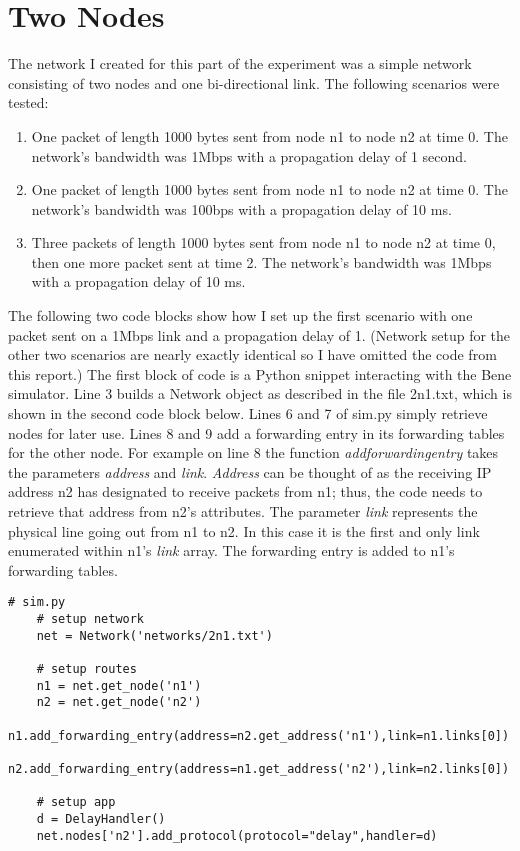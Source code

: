 \documentclass[11pt]{article}
\begin{document}
\section{Two Nodes}

The network I created for this part of the experiment was a simple network consisting of two nodes and one bi-directional link. The following scenarios were tested:

\begin{enumerate}

\item One packet of length 1000 bytes sent from node n1 to node n2 at time 0. The network's bandwidth was 1Mbps with a propagation delay of 1 second.

\item One packet of length 1000 bytes sent from node n1 to node n2 at time 0. The network's bandwidth was 100bps with a propagation delay of 10 ms.

\item Three packets of length 1000 bytes sent from node n1 to node n2 at time 0, then one more packet sent at time 2. The network's bandwidth was 1Mbps with a propagation delay of 10 ms.

\end{enumerate}

The following two code blocks show how I set up the first scenario with one packet sent on a 1Mbps link and a propagation delay of 1. (Network setup for the other two scenarios are nearly exactly identical so I have omitted the code from this report.) The first block of code is a Python snippet interacting with the Bene simulator. Line 3 builds a Network object as described in the file 2n1.txt, which is shown in the second code block below. Lines 6 and 7 of sim.py simply retrieve nodes for later use. Lines 8 and 9 add a forwarding entry in its forwarding tables for the other node. For example on line 8 the function \emph{add\textunderscore forwarding\textunderscore entry} takes the parameters \emph{address} and \emph{link}. \emph{Address} can be thought of as the receiving IP address n2 has designated to receive packets from n1; thus, the code needs to retrieve that address from n2's attributes. The parameter \emph{link} represents the physical line going out from n1 to n2. In this case it is the first and only link enumerated within n1's \emph{link} array. The forwarding entry is added to n1's forwarding tables.

\begin{lstlisting}
# sim.py
    # setup network
    net = Network('networks/2n1.txt')

    # setup routes
    n1 = net.get_node('n1')
    n2 = net.get_node('n2')
    n1.add_forwarding_entry(address=n2.get_address('n1'),link=n1.links[0])
    n2.add_forwarding_entry(address=n1.get_address('n2'),link=n2.links[0])

    # setup app
    d = DelayHandler()
    net.nodes['n2'].add_protocol(protocol="delay",handler=d)
\end{lstlisting}
\end{document}
